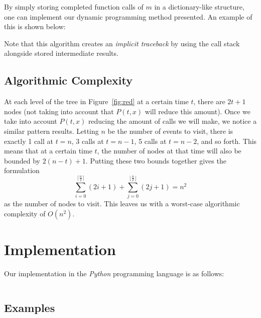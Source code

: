 \documentclass[titlepage,12pt]{article}
\begin{document}
By simply storing completed function calls of $m$ in a dictionary-like
structure, one can implement our dynamic programming method presented. An
example of this is shown below:

\begin{algorithm}
\begin{algorithmic}
    \Else
    \EndIf
    \EndFunction
\end{algorithmic}
\end{algorithm}

Note that this algorithm creates an \emph{implicit traceback} by using the call
stack alongside stored intermediate results.

\subsection{Algorithmic Complexity}

At each level of the tree in Figure~\ref{fig:red} at a certain time $t$, there
are $2t + 1$ nodes (not taking into account that $P(t, x)$ will reduce this
amount). Once we take into account $P(t, x)$ reducing the amount of calls we
will make, we notice a similar pattern results. Letting $n$ be the number of
events to visit, there is exactly 1 call at $t = n$, 3 calls at $t = n -1$, 5
calls at $t = n - 2$, and so forth. This means that at a certain time $t$, the
number of nodes at that time will also be bounded by $2(n - t) + 1$. Putting
these two bounds together gives the formulation
\begin{displaymath}
    \sum_{i=0}^{\lceil \frac{n}{2} \rceil} (2i + 1) +
    \sum_{j=0}^{\lfloor \frac{n}{2} \rfloor} (2j + 1) = n^2
\end{displaymath}
as the number of nodes to visit. This leaves us with a worst-case algorithmic
complexity of $O(n^2)$.

\section{Implementation}

Our implementation in the \emph{Python} programming language is as follows:

\inputminted{python3}{dp.py}

\subsection{Examples}


\end{document}
